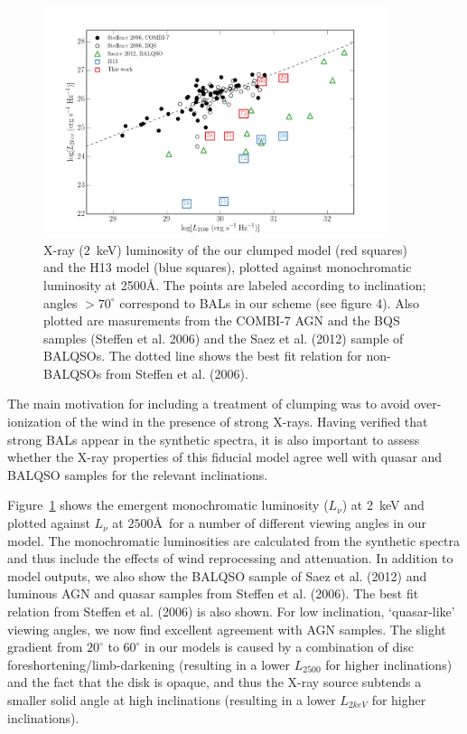 \documentclass[useAMS,usenatbib]{mn2e_x}
\begin{document}
\begin{figure}
\centering
\includegraphics[width=0.9\textwidth]{figures/lx_a05_pre.png}
\caption
{
X-ray ($2$~keV) luminosity of the our clumped model (red squares) 
and the H13 model (blue squares), plotted against monochromatic luminosity 
at 2500\AA. The points are labeled according to inclination; angles
$>70^\circ$ correspond to BALs in our scheme (see figure 4).
Also plotted are masurements from 
the COMBI-7 AGN and the BQS samples (Steffen et al. 2006) and the Saez et al. (2012) 
sample of BALQSOs. The dotted line shows the best fit relation for non-BALQSOs 
from Steffen et al. (2006).
}
\label{fig:xray}
\end{figure}

The main motivation for including a treatment of clumping was
to avoid over-ionization of the wind in the presence of strong X-rays. 
Having verified that strong BALs appear in the synthetic spectra,
it is also important to assess whether the X-ray properties of this
fiducial model agree well with quasar and BALQSO samples for the relevant
inclinations.

Figure~\ref{fig:xray} shows the emergent
monochromatic luminosity ($L_\nu$) at 2~keV and 
plotted against $L_\nu$ at $2500$\AA\ for a number of different viewing angles in our model.
The monochromatic luminosities are calculated from the synthetic spectra and thus include
the effects of wind reprocessing and attenuation. In addition to model outputs,
we also show the BALQSO sample of Saez et al. (2012) and luminous AGN and quasar
samples from Steffen et al. (2006). The best fit relation from Steffen et al. (2006) 
is also shown. For low inclination, `quasar-like' viewing angles,
we now find excellent agreement with AGN samples. The slight gradient from $20^\circ$ to
$60^\circ$ in our models is caused by a combination of disc foreshortening/limb-darkening 
(resulting in a lower $L_{2500}$ for higher inclinations) and the fact that the disk 
is opaque, and thus the X-ray source subtends a smaller solid angle at high inclinations
(resulting in a lower $L_{2keV}$ for higher inclinations). 
\end{document}
